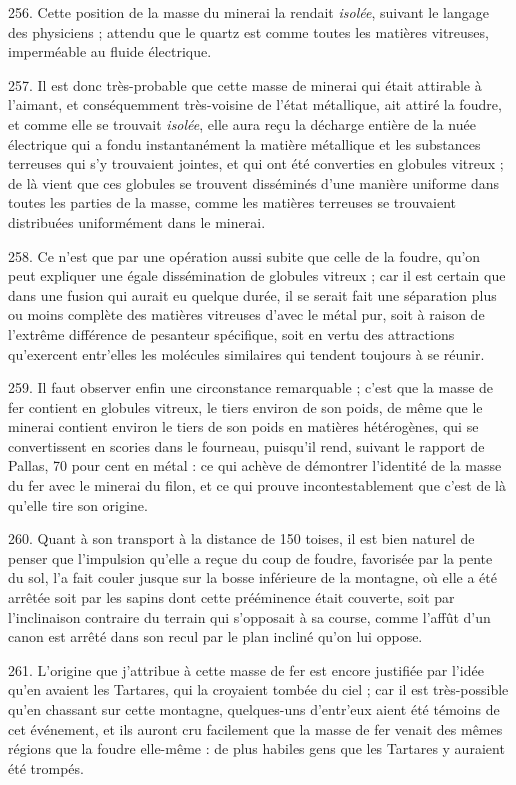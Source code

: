 \documentclass[a4paper, 11pt, oneside, polutonikogreek, french]{article}
\begin{document}
256. Cette position de la masse du minerai la rendait \emph{isolée}, suivant le langage des physiciens ; attendu que le quartz est comme toutes les matières vitreuses, imperméable au fluide électrique.

257. Il est donc très-probable que cette masse de minerai qui était attirable à l'aimant, et conséquemment très-voisine de l'état métallique, ait attiré la foudre, et comme elle se trouvait \emph{isolée}, elle aura reçu la décharge entière de la nuée électrique qui a fondu instantanément la matière métallique et les substances terreuses qui s'y trouvaient jointes, et qui ont été converties en globules vitreux ; de là vient que ces globules se trouvent disséminés d'une manière uniforme dans toutes les parties de la masse, comme les matières terreuses se trouvaient distribuées uniformément dans le minerai.

258. Ce n'est que par une opération aussi subite que celle de la foudre, qu'on peut expliquer une égale dissémination de globules vitreux ; car il est certain que dans une fusion qui aurait eu quelque durée, il se serait fait une séparation plus ou moins complète des matières vitreuses d'avec le métal pur, soit à raison de l'extrême différence de pesanteur spécifique, soit en vertu des attractions qu'exercent entr'elles les molécules similaires qui tendent toujours à se réunir.

259. Il faut observer enfin une circonstance remarquable ; c'est que la masse de fer contient en globules vitreux, le tiers environ de son poids, de même que le minerai contient environ le tiers de son poids en matières hétérogènes, qui se convertissent en scories dans le fourneau, puisqu'il rend, suivant le rapport de Pallas, 70 pour cent en métal : ce qui achève de démontrer l'identité de la masse du fer avec le minerai du filon, et ce qui prouve incontestablement que c'est de là qu'elle tire son origine.

260. Quant à son transport à la distance de 150 toises, il est bien naturel de penser que l'impulsion qu'elle a reçue du coup de foudre, favorisée par la pente du sol, l'a fait couler jusque sur la bosse inférieure de la montagne, où elle a été arrêtée soit par les sapins dont cette prééminence était couverte, soit par l'inclinaison contraire du terrain qui s'opposait à sa course, comme l'affût d'un canon est arrêté dans son recul par le plan incliné qu'on lui oppose.

261. L'origine que j'attribue à cette masse de fer est encore justifiée par l'idée qu'en avaient les Tartares, qui la croyaient tombée du ciel ; car il est très-possible qu'en chassant sur cette montagne, quelques-uns d'entr'eux aient été témoins de cet événement, et ils auront cru facilement que la masse de fer venait des mêmes régions que la foudre elle-même : de plus habiles gens que les Tartares y auraient été trompés.
\end{document}

